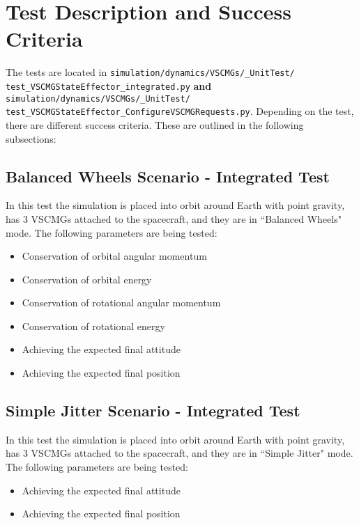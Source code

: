 \section{Test Description and Success Criteria}
The tests are located in \texttt{simulation/dynamics/VSCMGs/\_UnitTest/\newline
test\_VSCMGStateEffector\_integrated.py} \textbf{and} \texttt{simulation/dynamics/VSCMGs/\newline\_UnitTest/
test\_VSCMGStateEffector\_ConfigureVSCMGRequests.py}. Depending on the test, there are different success criteria. These are outlined in the following subsections:
\subsection{Balanced Wheels Scenario - Integrated Test}
In this test the simulation is placed into orbit around Earth with point gravity, has 3 VSCMGs attached to the spacecraft, and they are in ``Balanced Wheels" mode. The following parameters are being tested:
\begin{itemize}
	\item Conservation of orbital angular momentum
	\item Conservation of orbital energy
	\item Conservation of rotational angular momentum
	\item Conservation of rotational energy
	\item Achieving the expected final attitude
	\item Achieving the expected final position
\end{itemize}

\subsection{Simple Jitter Scenario - Integrated Test}
In this test the simulation is placed into orbit around Earth with point gravity, has 3 VSCMGs attached to the spacecraft, and they are in ``Simple Jitter" mode. The following parameters are being tested:
\begin{itemize}
\item Achieving the expected final attitude
\item Achieving the expected final position
\end{itemize}

